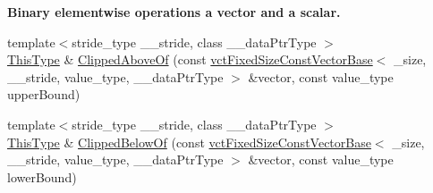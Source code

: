\begin{Indent}{\bf Binary elementwise operations a vector and a scalar.}
\begin{DoxyCompactItemize}
\item 
{\footnotesize template$<$stride\+\_\+type \+\_\+\+\_\+stride, class \+\_\+\+\_\+data\+Ptr\+Type $>$ }\\\hyperlink{classvct_fixed_size_const_vector_base_a071063bc4fa43112cc287b2dbef53180}{This\+Type} \& \hyperlink{classvct_fixed_size_vector_base_a4f846e089e35254e18426887916ad3bc}{Clipped\+Above\+Of} (const \hyperlink{classvct_fixed_size_const_vector_base}{vct\+Fixed\+Size\+Const\+Vector\+Base}$<$ \+\_\+size, \+\_\+\+\_\+stride, value\+\_\+type, \+\_\+\+\_\+data\+Ptr\+Type $>$ \&vector, const value\+\_\+type upper\+Bound)
\item 
{\footnotesize template$<$stride\+\_\+type \+\_\+\+\_\+stride, class \+\_\+\+\_\+data\+Ptr\+Type $>$ }\\\hyperlink{classvct_fixed_size_const_vector_base_a071063bc4fa43112cc287b2dbef53180}{This\+Type} \& \hyperlink{classvct_fixed_size_vector_base_abeb5ffb8580973d7929e608e22062c27}{Clipped\+Below\+Of} (const \hyperlink{classvct_fixed_size_const_vector_base}{vct\+Fixed\+Size\+Const\+Vector\+Base}$<$ \+\_\+size, \+\_\+\+\_\+stride, value\+\_\+type, \+\_\+\+\_\+data\+Ptr\+Type $>$ \&vector, const value\+\_\+type lower\+Bound)
\end{DoxyCompactItemize}
\end{Indent}
